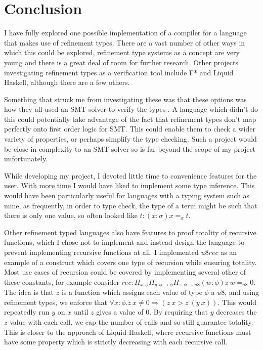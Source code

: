 \section{Conclusion}

I have fully explored one possible implementation of a compiler for a language that makes use of
refinement types.
There are a vast number of other ways in which this could be explored,
refinement type systems as a concept are very young and there is a great deal of room for further
research.
Other projects investigating refinement types as a verification tool include F* and Liquid Haskell,
although there are a few others.

Something that struck me from investigating these was that these options was how they all used
an SMT solver to verify the types \cite{vazouSJ14}.
A language which didn't do this could potentially take advantage of the fact that refinement types
don't map perfectly onto first order logic for SMT.
This could enable them to check a wider variety of properties, or perhaps simplify the type checking.
Such a project would be close in complexity to an SMT solver so is far beyond the scope of my
project unfortunately.

While developing my project, I devoted little time to convenience features for the user.
With more time I would have liked to implement some type inference.
This would have been particularly useful for languages with a typing system such as mine,
as frequently, in order to type check, the type of a term might be such that there is only one
value, so often looked like $t: (x: \sigma) x =_\sigma t$.

Other refinement typed languages also have features to proof totality of recursive functions,
which I chose not to implement and instead design the language to prevent implementing recursive
functions at all.
I implemented $u8rec$ as an example of a construct which covers one type of recursion while
ensuring totality.
Most use cases of recursion could be covered by implementing several other of these constants,
for example consider
$rec: \Pi_{x: \phi} \Pi_{y: \phi \rightarrow \phi} \Pi_{z: \phi \rightarrow u8} (w: \phi)z\ w =_{u8} 0$.
The idea is that $z$ is a function which assigns each value of type $\phi$ a $u8$, and using
refinement types, we enforce that $\forall x: \phi . z\ x \neq 0 \Rightarrow (z\ x > z\ (y\ x))$.
This would repeatedly run $y$ on $x$ until $z$ gives a value of 0.
By requiring that $y$ decreases the $z$ value with each call, we cap the number of calls and so
still guarantee totality.
This is closer to the approach of Liquid Haskell, where recursive functions must have some property
which is strictly decreasing with each recursive call.

